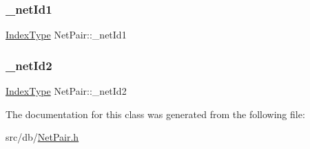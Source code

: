 \subsubsection{\texorpdfstring{\+\_\+net\+Id1}{\_netId1}}
{\footnotesize\ttfamily \hyperlink{type_8h_a581e8093e28e7362f2b6937296190676}{Index\+Type} Net\+Pair\+::\+\_\+net\+Id1\hspace{0.3cm}{\ttfamily [private]}}

\mbox{\label{classNetPair_a3ef7abb0edf2445be086f4f1202437ba}} 
\subsubsection{\texorpdfstring{\+\_\+net\+Id2}{\_netId2}}
{\footnotesize\ttfamily \hyperlink{type_8h_a581e8093e28e7362f2b6937296190676}{Index\+Type} Net\+Pair\+::\+\_\+net\+Id2\hspace{0.3cm}{\ttfamily [private]}}



The documentation for this class was generated from the following file\+:\begin{DoxyCompactItemize}
\item 
src/db/\hyperlink{NetPair_8h}{Net\+Pair.\+h}\end{DoxyCompactItemize}
